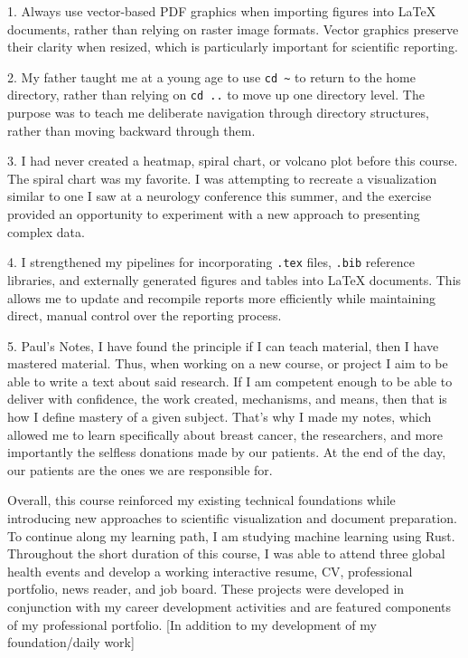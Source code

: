 \documentclass[12pt,letterpaper]{article}
\begin{document}
1. Always use vector-based PDF graphics when importing figures into LaTeX documents, rather than relying on raster image formats. Vector graphics preserve their clarity when resized, which is particularly important for scientific reporting.

2. My father taught me at a young age to use \texttt{cd \textasciitilde} to return to the home directory, rather than relying on \texttt{cd ..} to move up one directory level. The purpose was to teach me deliberate navigation through directory structures, rather than moving backward through them.

3. I had never created a heatmap, spiral chart, or volcano plot before this course. The spiral chart was my favorite. I was attempting to recreate a visualization similar to one I saw at a neurology conference this summer, and the exercise provided an opportunity to experiment with a new approach to presenting complex data.

4. I strengthened my pipelines for incorporating \texttt{.tex} files, \texttt{.bib} reference libraries, and externally generated figures and tables into LaTeX documents. This allows me to update and recompile reports more efficiently while maintaining direct, manual control over the reporting process.

5. Paul's Notes, I have found the principle if I can teach material, then I have mastered material. Thus, when working on a new course, or project I aim to be able to write a text about said research. If I am competent enough to be able to deliver with confidence, the work created, mechanisms, and means, then that is how I define mastery of a given subject. That's why I made my notes, which allowed me to learn specifically about breast cancer, the researchers, and more importantly the selfless donations made by our patients. At the end of the day, our patients are the ones we are responsible for. 

Overall, this course reinforced my existing technical foundations while introducing new approaches to scientific visualization and document preparation. To continue along my learning path, I am studying machine learning using Rust. Throughout the short duration of this course, I was able to attend three global health events and develop a working interactive resume, CV, professional portfolio, news reader, and job board. These projects were developed in conjunction with my career development activities and are featured components of my professional portfolio. [In addition to my development of my foundation/daily work]
\end{document}
